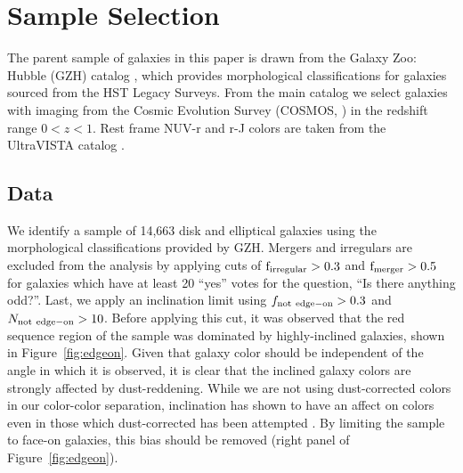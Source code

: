 \section{Sample Selection}
\label{sec:reddisksample}
The parent sample of galaxies in this paper is drawn from the Galaxy Zoo: Hubble (GZH) catalog \citep{Willett2016}, which provides morphological classifications for galaxies sourced from the HST Legacy Surveys. From the main catalog we select galaxies with imaging from the Cosmic Evolution Survey (COSMOS, \citet{Scoville2007}) in the redshift range $0<z<1$.  Rest frame NUV-r and r-J colors are taken from the UltraVISTA catalog \citep{McCracken2012,Ilbert2013}.

\subsection{Data}
\label{sec:Data}
We identify a sample of 14,663 disk and elliptical galaxies using the morphological classifications provided by GZH. Mergers and irregulars are excluded from the analysis by applying cuts of $\rm f_{irregular} > 0.3$ and $\rm f_{merger} > 0.5$ for galaxies which have at least 20 ``yes'' votes for the question, ``Is there anything odd?''. Last, we apply an inclination limit using $f_{\rm not~edge-on} > 0.3$ and $N_{\rm not~edge-on}>10$. Before applying this cut, it was observed that the red sequence region of the sample was dominated by highly-inclined galaxies, shown in Figure~\ref{fig:edgeon}. Given that galaxy color should be independent of the angle in which it is observed, it is clear that the inclined galaxy colors are strongly affected by dust-reddening. While we are not using dust-corrected colors in our color-color separation, inclination has shown to have an affect on colors even in those which dust-corrected has been attempted \citep{Morselli2016a,Devour2017}. By limiting the sample to face-on galaxies, this bias should be removed (right panel of Figure~\ref{fig:edgeon}). 
 
